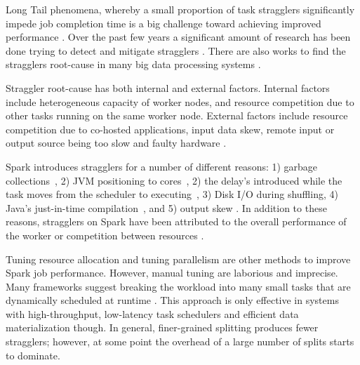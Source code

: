 \label{background}

Long Tail phenomena, whereby a small proportion of task stragglers significantly impede job completion time is a big challenge toward achieving improved performance \cite{Garraghan2016}.
Over the past few years a significant amount of research has been done trying to detect and mitigate stragglers \cite{Rosen2012, Dean2004, Chen2014, Bhandare2016, Kwon2012}. 
There are also works to find the stragglers root-cause in many big data processing systems \cite{Ballani2011, Ananthanarayanan2014, Jeyakumar2013, Li2014, Zaharia2012}.

Straggler root-cause has both internal and external factors. 
Internal factors include heterogeneous capacity of worker nodes, and resource competition due to other tasks running on the same worker node. 
External factors include resource competition due to co-hosted applications, input data skew, remote input or output source being too slow and faulty hardware \cite{Chen2014}.

Spark introduces stragglers for a number of different reasons: 1) garbage collections~\cite{Kyong2017,Ousterhout2017}, 2) JVM positioning to cores~\cite{Kyong2017}, 
2) the delay's introduced while the task moves from the scheduler to executing~\cite{Gittens2016}, 3) Disk I/O during shuffling, 4) Java's just-in-time compilation~\cite{Ousterhout2017}, 
and 5) output skew \cite{Ousterhout2017}. 
In addition to these reasons, stragglers on Spark have been attributed to the overall performance of the worker or competition between resources \cite{Yang2016}.

Tuning resource allocation and tuning parallelism are other methods to improve Spark job performance. 
However, manual tuning are laborious and imprecise. 
Many frameworks suggest breaking the workload into many small tasks that are dynamically scheduled at runtime \cite{Rosen2012}. 
This approach is only effective in systems with high-throughput, low-latency task schedulers and efficient data materialization though.
In general, finer-grained splitting produces fewer stragglers; however, at some point the overhead of a large number of splits starts to dominate. 

